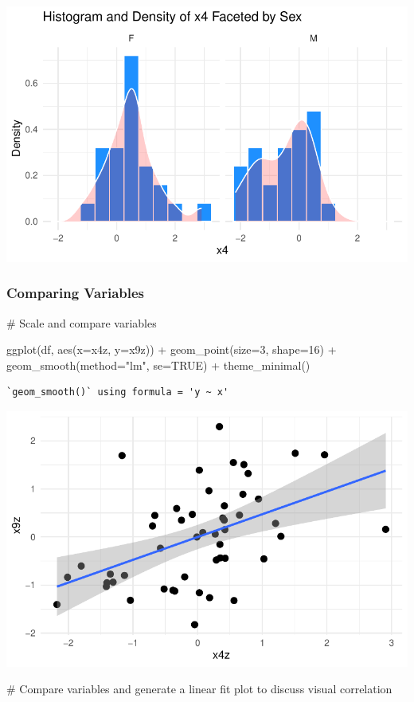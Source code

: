 \documentclass[
  letterpaper,
  DIV=11,
  numbers=noendperiod]{scrartcl}
\newenvironment{Shaded}{\begin{snugshade}}{\end{snugshade}}
\newcommand{\AttributeTok}[1]{\textcolor[rgb]{0.40,0.45,0.13}{#1}}
\newcommand{\CommentTok}[1]{\textcolor[rgb]{0.37,0.37,0.37}{#1}}
\newcommand{\ConstantTok}[1]{\textcolor[rgb]{0.56,0.35,0.01}{#1}}
\newcommand{\DecValTok}[1]{\textcolor[rgb]{0.68,0.00,0.00}{#1}}
\newcommand{\FunctionTok}[1]{\textcolor[rgb]{0.28,0.35,0.67}{#1}}
\newcommand{\NormalTok}[1]{\textcolor[rgb]{0.00,0.23,0.31}{#1}}
\newcommand{\SpecialCharTok}[1]{\textcolor[rgb]{0.37,0.37,0.37}{#1}}
\newcommand{\StringTok}[1]{\textcolor[rgb]{0.13,0.47,0.30}{#1}}
\begin{document}
\includegraphics{Module-1-Script-v2_files/figure-pdf/unnamed-chunk-8-1.pdf}

\subsubsection{Comparing Variables}\label{comparing-variables}

\begin{Shaded}
\begin{Highlighting}[]
\CommentTok{\# Scale and compare variables}

\FunctionTok{ggplot}\NormalTok{(df, }\FunctionTok{aes}\NormalTok{(}\AttributeTok{x=}\NormalTok{x4z, }\AttributeTok{y=}\NormalTok{x9z)) }\SpecialCharTok{+}
  \FunctionTok{geom\_point}\NormalTok{(}\AttributeTok{size=}\DecValTok{3}\NormalTok{, }\AttributeTok{shape=}\DecValTok{16}\NormalTok{) }\SpecialCharTok{+}
  \FunctionTok{geom\_smooth}\NormalTok{(}\AttributeTok{method=}\StringTok{"lm"}\NormalTok{, }\AttributeTok{se=}\ConstantTok{TRUE}\NormalTok{) }\SpecialCharTok{+}
  \FunctionTok{theme\_minimal}\NormalTok{()}
\end{Highlighting}
\end{Shaded}

\begin{verbatim}
`geom_smooth()` using formula = 'y ~ x'
\end{verbatim}

\includegraphics{Module-1-Script-v2_files/figure-pdf/unnamed-chunk-9-1.pdf}

\begin{Shaded}
\begin{Highlighting}[]
\CommentTok{\# Compare variables and generate a linear fit plot to discuss visual correlation}
\end{Highlighting}
\end{Shaded}
\end{document}
